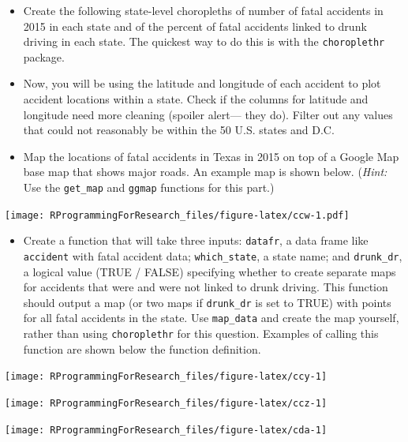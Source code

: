 \documentclass[]{book}
\providecommand{\tightlist}{%
  \setlength{\itemsep}{0pt}\setlength{\parskip}{0pt}}
\theoremstyle{definition}
\theoremstyle{definition}
\theoremstyle{definition}
\theoremstyle{remark}
\begin{document}
\begin{itemize}
\item
  Create the following state-level choropleths of number of fatal
  accidents in 2015 in each state and of the percent of fatal accidents
  linked to drunk driving in each state. The quickest way to do this is
  with the \texttt{choroplethr} package.
\item
  Now, you will be using the latitude and longitude of each accident to
  plot accident locations within a state. Check if the columns for
  latitude and longitude need more cleaning (spoiler alert--- they do).
  Filter out any values that could not reasonably be within the 50 U.S.
  states and D.C.
\item
  Map the locations of fatal accidents in Texas in 2015 on top of a
  Google Map base map that shows major roads. An example map is shown
  below. (\emph{Hint:} Use the \texttt{get\_map} and \texttt{ggmap}
  functions for this part.)
\end{itemize}

\texttt{[image: RProgrammingForResearch\_files/figure-latex/ccw-1.pdf]}

\begin{itemize}
\tightlist
\item
  Create a function that will take three inputs: \texttt{datafr}, a data
  frame like \texttt{accident} with fatal accident data;
  \texttt{which\_state}, a state name; and \texttt{drunk\_dr}, a logical
  value (TRUE / FALSE) specifying whether to create separate maps for
  accidents that were and were not linked to drunk driving. This
  function should output a map (or two maps if \texttt{drunk\_dr} is set
  to TRUE) with points for all fatal accidents in the state. Use
  \texttt{map\_data} and create the map yourself, rather than using
  \texttt{choroplethr} for this question. Examples of calling this
  function are shown below the function definition.
\end{itemize}

\begin{center}\texttt{[image: RProgrammingForResearch\_files/figure-latex/ccy-1]} \end{center}

\begin{center}\texttt{[image: RProgrammingForResearch\_files/figure-latex/ccz-1]} \end{center}

\begin{center}\texttt{[image: RProgrammingForResearch\_files/figure-latex/cda-1]} \end{center}
\end{document}
